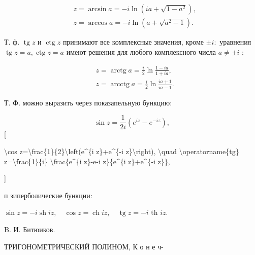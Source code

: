 \documentclass[10pt]{article}
\begin{document}
\[

\begin{aligned}

& z=\arcsin a=-i \ln \left(i a+\sqrt{1-a^{2}}\right), \\

& z=\arccos a=-i \ln \left(a+\sqrt{a^{2}-1}\right) .

\end{aligned}

\]



Т. ф. $\operatorname{tg} z$ и $\operatorname{ctg} z$ принимают все комплексные значения, кроме $\pm i:$ уравнения $\operatorname{tg} z=a, \operatorname{ctg} z=a$ имеют решения для любого комплексного числа $a \neq \pm i$ :



\[

\begin{aligned}

& z=\operatorname{arctg} a=\frac{i}{2} \ln \frac{1-i a}{1+i a}, \\

& z=\operatorname{arcctg} a=\frac{i}{2} \ln \frac{i a+1}{i a-1} .

\end{aligned}

\]



Т. Ф. можно выразить через показапельную бункцию:



\[

\sin z=\frac{1}{2 i}\left(e^{i z}-e^{-i z}\right),

\][



\textbackslash cos z=\textbackslash frac\{1\}\{2\}\textbackslash left(e\^{}\{i z\}+e\^{}\{-i z\}\textbackslash right), \textbackslash quad \textbackslash operatorname\{tg\} z=\textbackslash frac\{1\}\{i\} \textbackslash frac\{e\^{}\{i z\}-e-i z\}\{e\^{}\{i z\}+e\^{}\{-i z\}\},

]



п зиперболические бункции:



$\sin z=-i \operatorname{sh} i z, \quad \cos z=\operatorname{ch} i z, \quad \operatorname{tg} z=-i$ th $i z$.



B. И. Битюиков.



ТРИГОНОМЕТРИЧЕСКИЙ ПОЛИНОМ, К о н е ч-
\end{document}
